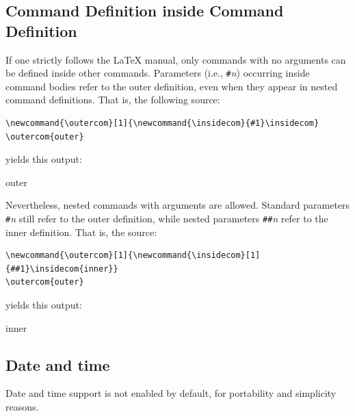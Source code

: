 \subsection{Command Definition inside Command Definition}
If one strictly follows the \LaTeX{} manual, only commands with no
arguments can be defined inside other commands.
Parameters (i.e., \verb+#+\textit{n}) occurring inside command bodies
refer to the outer definition, even when they appear in nested
command definitions.
That is, the following source:
\begin{verbatim}
\newcommand{\outercom}[1]{\newcommand{\insidecom}{#1}\insidecom}
\outercom{outer}
\end{verbatim}
yields this output:
\begin{center}
\newcommand{\outercom}[1]{\newcommand{\insidecom}{#1}\insidecom}
\outercom{outer}
\end{center}

Nevertheless, nested commands with arguments are allowed.
Standard parameters \verb+#+\textit{n} still refer to the outer
definition, while nested parameters \verb+##+\textit{n} refer to the
inner definition.
That is, the source:
\begin{verbatim}
\newcommand{\outercom}[1]{\newcommand{\insidecom}[1]{##1}\insidecom{inner}}
\outercom{outer}
\end{verbatim}
yields this output:
\begin{center}
\newcommand{\outercom}[1]{\newcommand{\insidecom}[1]{##1}\insidecom{inner}}
\outercom{outer}
\end{center}

\subsection{Date and time}
Date and time support is not enabled by default, for portability and
simplicity reasons.

